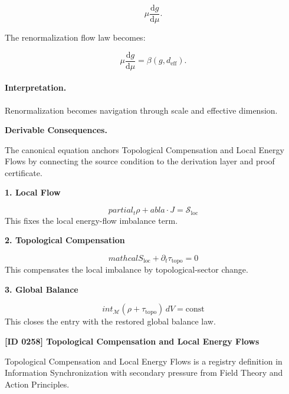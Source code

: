 \begin{equation}
\mu\frac{\mathrm{d}g}{\mathrm{d}\mu}.
\end{equation}

The renormalization flow law becomes:

\begin{equation}
\boxed{
\mu\frac{\mathrm{d}g}{\mathrm{d}\mu}
=
\beta(g,d_{\mathrm{eff}}).
}
\end{equation}

\paragraph{Interpretation.}
Renormalization becomes navigation through scale and effective dimension.

\par\vspace{0.35em}
\noindent\textbf{Derivable Consequences.}\quad
\begingroup
\footnotesize
\raggedright
The canonical equation anchors Topological Compensation and Local Energy Flows by connecting the source condition to the derivation layer and proof certificate.
\par\endgroup

\noindent\textbf{1. Local Flow}\par
\[
partial_t \rho +  abla\cdot J = \mathcal{S}_{\mathrm{loc}}
\]
\noindent This fixes the local energy-flow imbalance term.\par
\noindent\textbf{2. Topological Compensation}\par
\[
mathcal{S}_{\mathrm{loc}} + \partial_t \tau_{\mathrm{topo}} = 0
\]
\noindent This compensates the local imbalance by topological-sector change.\par
\noindent\textbf{3. Global Balance}\par
\[
int_{\mathcal{M}} (\rho + \tau_{\mathrm{topo}})\,dV = \mathrm{const}
\]
\noindent This closes the entry with the restored global balance law.\par

\clearpage
\noindent\textbf{[ID 0258] Topological Compensation and Local Energy Flows}\par
\vspace{0.35em}
\begingroup\small
{}
Topological Compensation and Local Energy Flows is a registry definition in Information Synchronization with secondary pressure from Field Theory and Action Principles.

